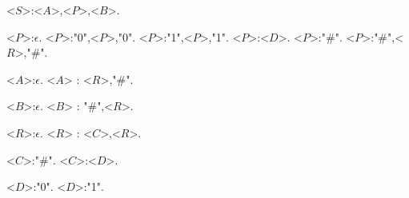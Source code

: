 <$S$>:<$A$>,<$P$>,<$B$>.

<$P$>:$\epsilon$.
<$P$>:"0",<$P$>,"0".
<$P$>:"1",<$P$>,"1".
<$P$>:<$D$>.
<$P$>:"\#".
<$P$>:"\#",<$R$>,"\#".

<$A$>:$\epsilon$.
<$A$> : <$R$>,"\#".

<$B$>:$\epsilon$.
<$B$> : "\#",<$R$>.

<$R$>:$\epsilon$.
<$R$> : <$C$>,<$R$>.

<$C$>:"\#".
<$C$>:<$D$>.

<$D$>:"0".
<$D$>:"1".